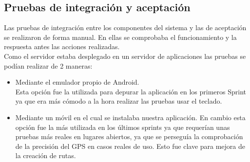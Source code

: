 \subsection{Pruebas de integración y aceptación}
Las pruebas de integración entre los componentes del sistema y las de aceptación se realizaron de forma manual. En ellas se comprobaba el funcionamiento y la respuesta antes las acciones realizadas.\\
Como el servidor estaba desplegado en un servidor de aplicaciones las pruebas se podían realizar de 2 maneras:
\begin{itemize}
\item Mediante el emulador propio de Android.\\
Esta opción fue la utilizada para depurar la aplicación en los primeros Sprint ya que era más cómodo a la hora realizar las pruebas usar el teclado.
\item  Mediante un móvil en el cual se instalaba nuestra aplicación. En cambio esta opción  fue la más utilizada en los últimos sprints ya que requerían unas pruebas más reales en  lugares abiertos, ya que se perseguía la comprobación de la precisión del GPS  en casos reales de uso. Esto fue clave para mejora de la creación de rutas.
\end{itemize}







